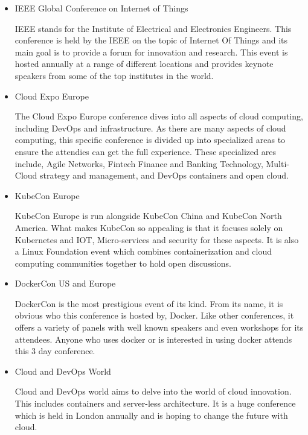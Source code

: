 \begin{itemize}
    \item IEEE Global Conference on Internet of Things \cite{Reference2}
    
    IEEE stands for the Institute of Electrical and Electronics Engineers. This conference is held by the IEEE on the topic of Internet Of Things and its main goal is to provide a forum for innovation and research. This event is hosted annually at a range of different locations and provides keynote speakers from some of the top institutes in the world.
    
    \item Cloud Expo Europe \cite{Reference3}
    
    The Cloud Expo Europe conference dives into all aspects of cloud computing, including DevOps and infrastructure. As there are many aspects of cloud computing, this specific conference is divided up into specialized areas to ensure the attendies can get the full experience. These specialized ares include, Agile Networks, Fintech Finance and Banking Technology, Multi-Cloud strategy and management, and DevOps containers and open cloud. 
    
    \item KubeCon Europe \cite{Reference4}
    
    KubeCon Europe is run alongside KubeCon China and KubeCon North America. What makes KubeCon so appealing is that it focuses solely on Kubernetes and IOT, Micro-services and security for these aspects. It is also a Linux Foundation event which combines containerization and cloud computing communities together to hold open discussions. 
  
    
    \item DockerCon US and Europe \cite{Reference5}
    
    DockerCon is the most prestigious event of its kind. From its name, it is obvious who this conference is hosted by, Docker. Like other conferences, it offers a variety of panels with well known speakers and even workshops for its attendees. Anyone who uses docker or is interested in using docker attends this 3 day conference. 
    
    
    \item Cloud and DevOps World  \cite{Reference6}
    
    Cloud and DevOps world aims to delve into the world of cloud innovation. This includes containers and server-less architecture. It is a huge conference which is held in London annually and is hoping to change the future with cloud.
    
    
    
\end{itemize}


